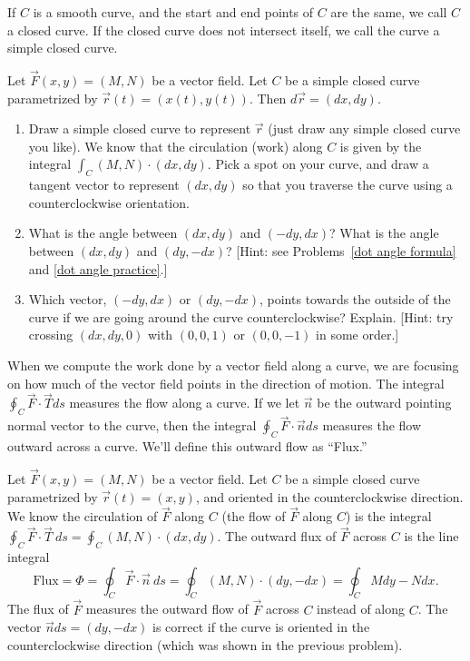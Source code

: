 \begin{definition}
 If $C$ is a smooth curve, and the start and end points of $C$ are the same, we call $C$ a closed curve.  If the closed curve does not intersect itself, we call the curve a simple closed curve.
\end{definition}


\begin{problem}
 Let $\vec F(x,y)=(M,N)$ be a vector field.  Let $C$ be a simple closed curve parametrized by $\vec r(t)=(x(t),y(t))$. Then $d\vec r = (dx, dy)$.
\begin{enumerate}
 \item Draw a simple closed curve to represent $\vec r$ (just draw any simple closed curve you like).  We know that the circulation (work) along $C$ is given by the integral $\int_C (M,N)\cdot (dx,dy)$.  Pick a spot on your curve, and draw a tangent vector to represent $(dx,dy)$ so that you traverse the curve using a counterclockwise orientation.
 
 \item What is the angle between $(dx,dy)$ and $(-dy,dx)$?  What is the angle between $(dx,dy)$ and $(dy,-dx)$? [Hint: see Problems~\ref{dot angle formula} and \ref{dot angle practice}.]
\item Which vector, $(-dy,dx)$ or $(dy,-dx)$, points towards the outside of the curve if we are going around the curve counterclockwise? Explain. [Hint: try crossing $(dx,dy,0)$ with $(0,0,1)$ or $(0,0,-1)$ in some order.]
\end{enumerate}
\end{problem}

When we compute the work done by a vector field along a curve, we are focusing on how much of the vector field points in the direction of motion.  The integral $\oint_C \vec F \cdot \vec T ds$ measures the flow along a curve.  If we let $\vec n$ be the outward pointing normal vector to the curve, then the integral $\oint_C \vec F \cdot \vec n ds$ measures the flow outward across a curve. We'll define this outward flow as ``Flux.''

\begin{definition}[Flux]
%
 Let $\vec F(x,y)=(M,N)$ be a vector field.  Let $C$ be a simple closed curve parametrized by $\vec r(t)=(x,y)$, and oriented in the counterclockwise direction. 
 We know the circulation of $\vec F$ along $C$ (the flow of $\vec F$ along $C$) is the integral $\oint_C \vec F\cdot \vec T\ ds = \oint_C (M,N)\cdot(dx,dy)$. The outward flux of $\vec F$ across $C$ is the line integral
$$\text{Flux}=\Phi = \oint_C \vec F\cdot \vec n\ ds = \oint_C (M,N)\cdot(dy,-dx) = \oint_C Mdy-Ndx.$$
The flux of $\vec F$ measures the outward flow of $\vec F$ across $C$ instead of along $C$.
The vector $\vec n ds = (dy,-dx)$ is correct if the curve is oriented in the counterclockwise direction (which was shown in the previous problem).
\end{definition}

